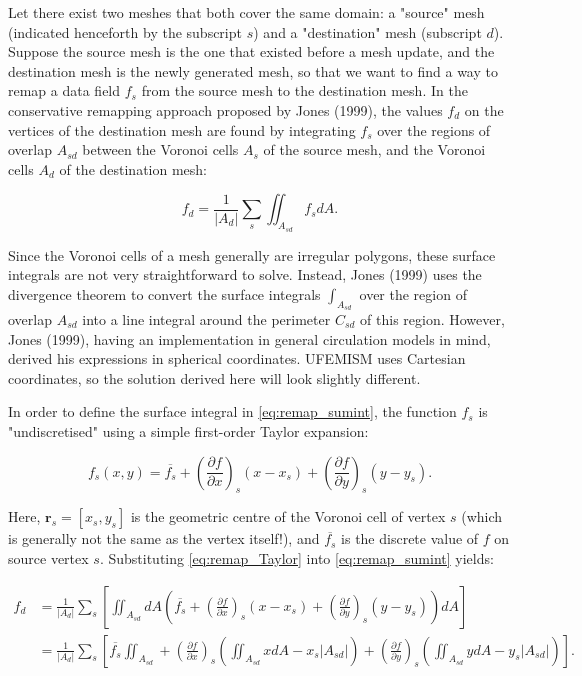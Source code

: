\documentclass{article}
\begin{document}
Let there exist two meshes that both cover the same domain: a "source" mesh (indicated henceforth by the subscript $s$) and a "destination" mesh (subscript $d$). Suppose the source mesh is the one that existed before a mesh update, and the destination mesh is the newly generated mesh, so that we want to find a way to remap a data field $f_s$ from the source mesh to the destination mesh. In the conservative remapping approach proposed by Jones (1999), the values $f_d$ on the vertices of the destination mesh are found by integrating $f_s$ over the regions of overlap $A_{sd}$ between the Voronoi cells $A_s$ of the source mesh, and the Voronoi cells $A_d$ of the destination mesh:

\begin{equation} \label{eq:remap_sumint}
f_d = \frac{1}{|A_d|} \sum_s \iint_{A_{sd}} f_s dA.
\end{equation}

Since the Voronoi cells of a mesh generally are irregular polygons, these surface integrals are not very straightforward to solve. Instead, Jones (1999) uses the divergence theorem to convert the surface integrals $\int_{A_{sd}}$ over the region of overlap $A_{sd}$ into a line integral around the perimeter $C_{sd}$ of this region. However, Jones (1999), having an implementation in general circulation models in mind, derived his expressions in spherical coordinates. UFEMISM uses Cartesian coordinates, so the solution derived here will look slightly different.

In order to define the surface integral in \eqref{eq:remap_sumint}, the function $f_s$ is "undiscretised" using a simple first-order Taylor expansion:

\begin{equation} \label{eq:remap_Taylor}
f_s(x,y) = \overline{f_s} + {\left( \frac{\partial f}{\partial x} \right)}_s \left( x - x_s \right) + {\left( \frac{\partial f}{\partial y} \right)}_s \left( y - y_s \right).
\end{equation}

Here, $\textbf{r}_s = \left[ x_s, y_s \right]$ is the geometric centre of the Voronoi cell of vertex $s$ (which is generally not the same as the vertex itself!), and $\overline{f_s}$ is the discrete value of $f$ on source vertex $s$. Substituting \eqref{eq:remap_Taylor} into \eqref{eq:remap_sumint} yields:

\begin{align} \label{eq:remap_sumint2}
f_d &= \frac{1}{|A_d|} \sum_s \left[ \iint_{A_{sd}} dA \left( \overline{f_s} + 
{\left( \frac{\partial f}{\partial x} \right)}_s \left( x - x_s \right) + 
{\left( \frac{\partial f}{\partial y} \right)}_s \left( y - y_s \right) \right) dA \right] \\
&= \frac{1}{|A_d|} \sum_s \left[ \overline{f_s} \iint_{A_{sd}} + 
{\left( \frac{\partial f}{\partial x} \right)}_s \left( \iint_{A_{sd}} xdA - x_s |A_{sd}| \right) +
{\left( \frac{\partial f}{\partial y} \right)}_s \left( \iint_{A_{sd}} ydA - y_s |A_{sd}| \right) \right].
\end{align}
\end{document}
